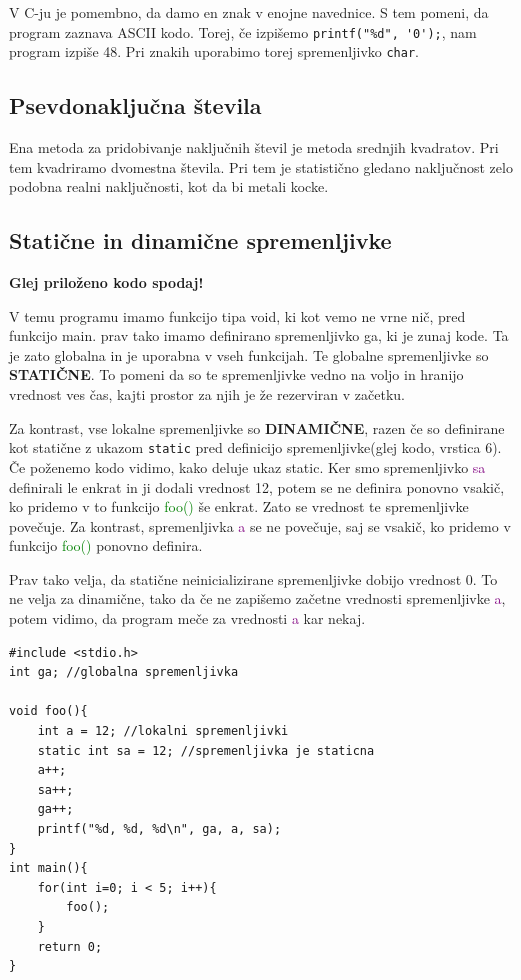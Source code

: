 \documentclass[a4paper, 12pt]{article}
\begin{document}
V C-ju je pomembno, da damo en znak v enojne navednice. S tem pomeni, da program zaznava ASCII kodo. Torej, če izpišemo \lstinline|printf("%d", '0');|, nam program izpiše 48. Pri znakih uporabimo torej spremenljivko \lstinline|char|.

\subsection{Psevdonaključna števila}
Ena metoda za pridobivanje naključnih števil je metoda srednjih kvadratov.
Pri tem kvadriramo dvomestna števila. Pri tem je statistično gledano naključnost zelo podobna realni naključnosti, kot da bi metali kocke.

\subsection{Statične in dinamične spremenljivke}
\textbf{Glej priloženo kodo spodaj!}

V temu programu imamo funkcijo tipa void, ki kot vemo ne vrne nič, pred funkcijo main. prav tako imamo definirano spremenljivko ga, ki je zunaj kode. Ta je zato globalna in je uporabna v vseh funkcijah. Te globalne spremenljivke so \textbf{STATIČNE}. To pomeni da so te spremenljivke vedno na voljo in hranijo vrednost ves čas, kajti prostor za njih je že rezerviran v začetku.

Za kontrast, vse lokalne spremenljivke so \textbf{DINAMIČNE}, razen če so definirane kot statične z ukazom \lstinline|static| pred definicijo spremenljivke(glej kodo, vrstica 6). Če poženemo kodo vidimo, kako deluje ukaz static. Ker smo spremenljivko \textcolor{purple}{sa} definirali le enkrat in ji dodali vrednost 12, potem se ne definira ponovno vsakič, ko pridemo v to funkcijo \textcolor{green}{foo()} še enkrat. Zato se vrednost te spremenljivke povečuje. Za kontrast, spremenljivka \textcolor{purple}{a} se ne povečuje, saj se vsakič, ko pridemo v funkcijo \textcolor{green}{foo()} ponovno definira.

Prav tako velja, da statične neinicializirane spremenljivke dobijo vrednost 0. To ne velja za dinamične, tako da če ne zapišemo začetne vrednosti spremenljivke \textcolor{purple}{a}, potem vidimo, da program meče za vrednosti \textcolor{purple}{a} kar nekaj.

\pagebreak

\begin{lstlisting}[caption = Statične in dinamične spremenljivke]
#include <stdio.h>
int ga; //globalna spremenljivka

void foo(){
	int a = 12;	//lokalni spremenljivki
	static int sa = 12; //spremenljivka je staticna
	a++;
	sa++;
	ga++;
	printf("%d, %d, %d\n", ga, a, sa);
}
int main(){
	for(int i=0; i < 5; i++){
		foo();
	}
	return 0;
}	
\end{lstlisting}
\end{document}
